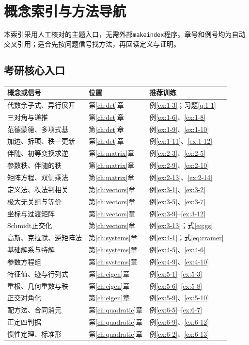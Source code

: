 \chapter{概念索引与方法导航}\label{app:index}
本索引采用人工核对的主题入口，无需外部\texttt{makeindex}程序。章号和例号均为自动交叉引用；适合先按问题信号找方法，再回读定义与证明。
\section{考研核心入口}\label{app:exam_core}
\begin{longtable}{@{}p{}p{}p{}@{}}
\toprule 概念或信号&位置&推荐训练\\\midrule\endhead
代数余子式、异行展开&第\ref{ch:det}章&例\ref{ex:1-3}；习题\ref{q:1-1}\\
三对角与递推&第\ref{ch:det}章&例\ref{ex:1-6}、\ref{ex:1-8}\\
范德蒙德、多项式基&第\ref{ch:det}章&例\ref{ex:1-9}、\ref{ex:1-10}\\
加边、拆项、秩一更新&第\ref{ch:det}章&例\ref{ex:1-11}、\ref{ex:1-12}\\
伴随、初等变换求逆&第\ref{ch:matrix}章&例\ref{ex:2-3}、\ref{ex:2-5}\\
参数秩、伴随的秩&第\ref{ch:matrix}章&例\ref{ex:2-9}、\ref{ex:2-10}\\
矩阵方程、双侧乘法&第\ref{ch:matrix}章&例\ref{ex:2-13}、\ref{ex:2-14}\\
定义法、秩法判相关&第\ref{ch:vectors}章&例\ref{ex:3-1}、\ref{ex:3-2}\\
极大无关组与等价&第\ref{ch:vectors}章&例\ref{ex:3-5}、\ref{ex:3-7}\\
坐标与过渡矩阵&第\ref{ch:vectors}章&例\ref{ex:3-9}--\ref{ex:3-12}\\
Schmidt正交化&第\ref{ch:vectors}章&例\ref{ex:3-13}；式\eqref{eq:gs}\\
高斯、克拉默、逆矩阵法&第\ref{ch:systems}章&例\ref{ex:4-1}；式\eqref{eq:cramer}\\
基础解系与特解&第\ref{ch:systems}章&例\ref{ex:4-5}、\ref{ex:4-6}\\
参数方程组&第\ref{ch:systems}章&例\ref{ex:4-9}、\ref{ex:4-10}\\
特征值、迹与行列式&第\ref{ch:eigen}章&例\ref{ex:5-1}--\ref{ex:5-3}\\
重根、几何重数与秩&第\ref{ch:eigen}章&例\ref{ex:5-6}--\ref{ex:5-8}\\
正交对角化&第\ref{ch:eigen}章&例\ref{ex:5-9}、\ref{ex:5-10}\\
配方法、合同消元&第\ref{ch:quadratic}章&例\ref{ex:6-5}--\ref{ex:6-7}\\
正定四判据&第\ref{ch:quadratic}章&例\ref{ex:6-9}、\ref{ex:6-12}\\
惯性定理、标准形&第\ref{ch:quadratic}章&例\ref{ex:6-2}、\ref{ex:6-13}\\
\bottomrule
\end{longtable}
